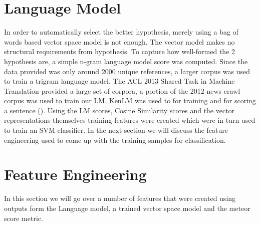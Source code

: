 \documentclass[11pt]{article}
\begin{document}
 \section{Language Model}
 In order to automatically select the better hypothesis, merely using a bag of
 words based vector space model is not enough. The vector model makes no
 structural requirements from hypothesis. To capture how well-formed the 2
 hypothesis are, a simple n-gram language model score was computed. Since the
 data provided was only around 2000 unique references, a larger corpus was used
 to train a trigram language model. The ACL 2013 Shared Task in Machine
 Translation provided a large set of corpora, a portion of the 2012 news crawl
 corpus was used to train our LM. KenLM was used to for training and for scoring a
 sentence (\cite{heafield2011kenlm}). Using the LM scores, Cosine Similarity
 scores and the vector representations themselves training features were created
 which were in turn used to train an SVM classifier. In the next section we will
 discuss the feature engineering used to come up with the training samples for
 classification.
 \section{Feature Engineering}
In this section we will go over a number of features that were created using
outputs form the Language model, a trained vector space model and the meteor
score metric.
\end{document}
